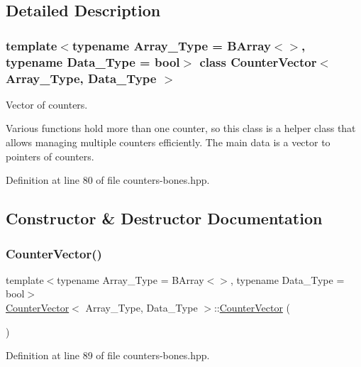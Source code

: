 \subsection{Detailed Description}
\subsubsection*{template$<$typename Array\+\_\+\+Type = B\+Array$<$$>$, typename Data\+\_\+\+Type = bool$>$\newline
class Counter\+Vector$<$ Array\+\_\+\+Type, Data\+\_\+\+Type $>$}

Vector of counters. 

Various functions hold more than one counter, so this class is a helper class that allows managing multiple counters efficiently. The main data is a vector to pointers of counters. 

Definition at line 80 of file counters-\/bones.\+hpp.



\subsection{Constructor \& Destructor Documentation}
\mbox{\label{class_counter_vector_a536074f2ce013785e547a7bc30bc1942}} 
\subsubsection{\texorpdfstring{Counter\+Vector()}{CounterVector()}}
{\footnotesize\ttfamily template$<$typename Array\+\_\+\+Type = B\+Array$<$$>$, typename Data\+\_\+\+Type = bool$>$ \\
\hyperlink{class_counter_vector}{Counter\+Vector}$<$ Array\+\_\+\+Type, Data\+\_\+\+Type $>$\+::\hyperlink{class_counter_vector}{Counter\+Vector} (\begin{DoxyParamCaption}{ }\end{DoxyParamCaption})\hspace{0.3cm}{\ttfamily [inline]}}



Definition at line 89 of file counters-\/bones.\+hpp.

\mbox{\label{class_counter_vector_ac6fc360b2df296630fb2614836dd74af}} 
